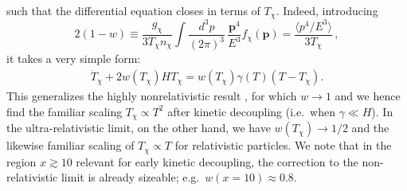 \documentclass[twocolumn,showpacs,amsmath,amssymb,superscriptaddress,nofootinbib]{revtex4-1}
\newcommand{\be}{\begin{equation}}
\newcommand{\ee}{\end{equation}}
\begin{document}
such that the differential equation closes in terms of $T_{\chi}$. Indeed, introducing
\be
2(1-w)\equiv \frac{g_\chi}{3T_\chi n_\chi}\int \frac{d^3p}{(2\pi)^3}\,\frac{\mathbf{p}^4}{E^3} f_\chi(\mathbf{p})
= \frac{\langle p^4/E^3 \rangle}{3T_\chi} \,,\label{wdef}
\ee
it takes a very simple form:
\begin{align}
\dot{T}_{\chi} +  2 w(T_{\chi}) H T_{\chi}  =  w(T_{\chi}) \gamma(T) \left( T - T_{\chi}\right).\label{eq:semireltemperature}
\end{align}
This generalizes the highly nonrelativistic result  \cite{Bringmann:2006mu}, for which $w\to1$ and we hence find 
the familiar scaling $T_{\chi} \propto T^2$ after kinetic decoupling (i.e.~when $\gamma \ll H$). In the
ultra-relativistic limit, on the other hand, we have $w(T_{\chi}) \rightarrow 1/2$ and the likewise familiar
scaling of $T_{\chi} \propto T$ for relativistic particles. We note that in the region $x \gtrsim 10$ 
relevant for early kinetic decoupling, the correction to the non-relativistic limit is already sizeable; 
e.g.~$w(x=10) \approx 0.8$.




\end{document}
